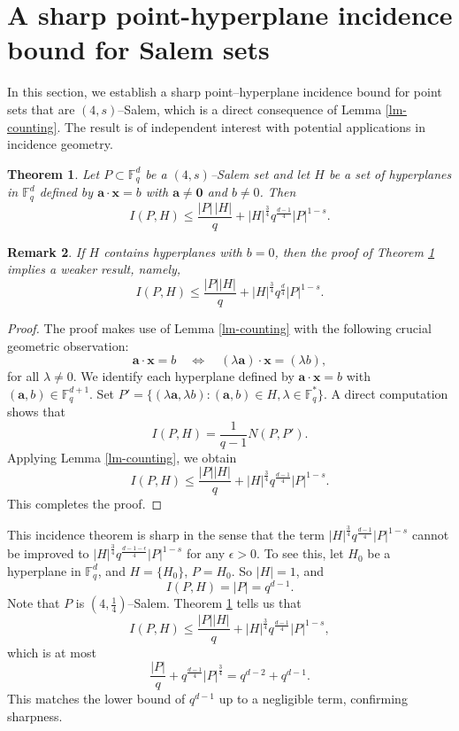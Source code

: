 \documentclass[11pt]{article}
\newtheorem{theorem}{Theorem}
\newtheorem{remark}[theorem]{Remark}
\newcommand{\Fqd}{\mathbb{F}_q^d}
\begin{document}
\section{A sharp point-hyperplane incidence bound for Salem sets}\label{section-6}

In this section, we establish a sharp point–hyperplane incidence bound for point sets that are $(4,s)$–Salem, which is a direct consequence of Lemma \ref{lm-counting}. The result is of independent interest with potential applications in incidence geometry.

\begin{theorem}\label{nonzero}
Let $P \subset \Fqd$ be a $(4, s)$--Salem set and let $H$ be a set of
hyperplanes in $\Fqd$ defined by $\mathbf{a}\cdot \mathbf{x}=b$ with $\mathbf{a}\ne \mathbf{0}$ and $b\ne 0$. Then
\[
I(P, H) \leq \frac{|P| \, |H|}{q} + |H|^{\frac{3}{4}} q^{\frac{d-1}{4}} |P|^{1-s}.
\]
\end{theorem}


\begin{remark}
    If $H$ contains hyperplanes with $b=0$, then the proof of Theorem \ref{nonzero} implies a weaker result, namely, 
    \[
I(P, H) \leq \frac{|P| |H|}{q} + |H|^{\frac{3}{4}} q^{\frac{d}{4}} |P|^{1-s}.
\]
\end{remark}

\begin{proof} 
The proof makes use of Lemma \ref{lm-counting} with the following crucial geometric observation: 
\[\mathbf{a}\cdot\mathbf{x}=b \quad\iff\quad (\lambda \mathbf{a})\cdot\mathbf{x}=(\lambda b),\]
for all $\lambda\ne 0$. We identify each hyperplane defined by $\mathbf{a} \cdot \mathbf{x} = b$ with $(\mathbf{a}, b)\in \mathbb{F}_q^{d+1}$. Set $P'=\{(\lambda \mathbf{a}, \lambda b)\colon (\mathbf{a}, b)\in H, \lambda\in \mathbb F_q^*\}$. A direct computation shows that 
\[I(P, H)=\frac{1}{q-1}N(P, P').\]
Applying Lemma \ref{lm-counting}, we obtain 
  \[
I(P, H) \leq \frac{|P||H|}{q} + |H|^{\frac{3}{4}} q^{\frac{d-1}{4}} |P|^{1-s}.
\]
This completes the proof.
\end{proof}


This incidence theorem is sharp in the sense that the term $|H|^{\frac{3}{4}} q^{\frac{d-1}{4}} |P|^{1-s}$ cannot be improved to $|H|^{\frac{3}{4}} q^{\frac{d-1-\epsilon}{4}} |P|^{1-s}$ for any $\epsilon>0$. To see this, let $H_0$ be a hyperplane in $\mathbb{F}_q^d$, and $H = \{H_0\}$, $P=H_0$. So $|H| = 1$, and 
\[
I(P, H) = |P| = q^{d-1}.
\]
Note that $P$ is $(4, \frac{1}{4})$--Salem. Theorem \ref{nonzero} tells us that
\[
I(P, H) \leq \frac{|P||H|}{q} + |H|^{\frac{3}{4}} q^{\frac{d-1}{4}} |P|^{1-s},
\]
which is at most 
\[\frac{|P|}{q}+q^{\frac{d-1}{4}}|P|^{\frac{3}{4}}=q^{d-2}+q^{d-1}.\]
This matches the lower bound of $q^{d-1}$ up to a negligible term, confirming sharpness. 
\end{document}
